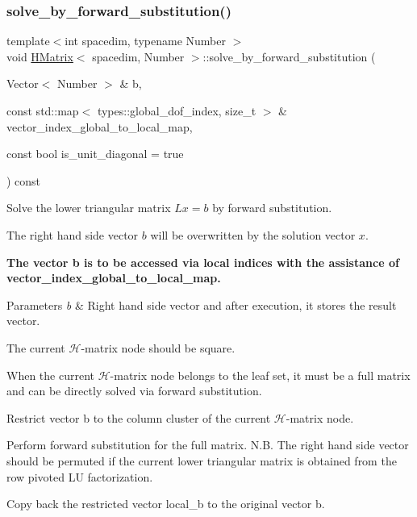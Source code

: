 \subsubsection{\texorpdfstring{solve\+\_\+by\+\_\+forward\+\_\+substitution()}{solve\_by\_forward\_substitution()}\hspace{0.1cm}{\footnotesize\ttfamily [3/4]}}
{\footnotesize\ttfamily template$<$int spacedim, typename Number $>$ \\
void \hyperlink{classHMatrix}{H\+Matrix}$<$ spacedim, Number $>$\+::solve\+\_\+by\+\_\+forward\+\_\+substitution (\begin{DoxyParamCaption}\item[{Vector$<$ Number $>$ \&}]{b,  }\item[{const std\+::map$<$ types\+::global\+\_\+dof\+\_\+index, size\+\_\+t $>$ \&}]{vector\+\_\+index\+\_\+global\+\_\+to\+\_\+local\+\_\+map,  }\item[{const bool}]{is\+\_\+unit\+\_\+diagonal = {\ttfamily true} }\end{DoxyParamCaption}) const}

Solve the lower triangular matrix $Lx=b$ by forward substitution.

The right hand side vector $b$ will be overwritten by the solution vector $x$.

{\bfseries The vector {\ttfamily b} is to be accessed via local indices with the assistance of {\ttfamily vector\+\_\+index\+\_\+global\+\_\+to\+\_\+local\+\_\+map}.}


\begin{DoxyParams}{Parameters}
{\em b} & Right hand side vector and after execution, it stores the result vector. \\
\hline
\end{DoxyParams}
The current $\mathcal{H}$-\/matrix node should be square.

When the current $\mathcal{H}$-\/matrix node belongs to the leaf set, it must be a full matrix and can be directly solved via forward substitution.

Restrict vector {\ttfamily b} to the column cluster of the current $\mathcal{H}$-\/matrix node.

Perform forward substitution for the full matrix. N.\+B. The right hand side vector should be permuted if the current lower triangular matrix is obtained from the row pivoted LU factorization.

Copy back the restricted vector {\ttfamily local\+\_\+b} to the original vector {\ttfamily b}.

